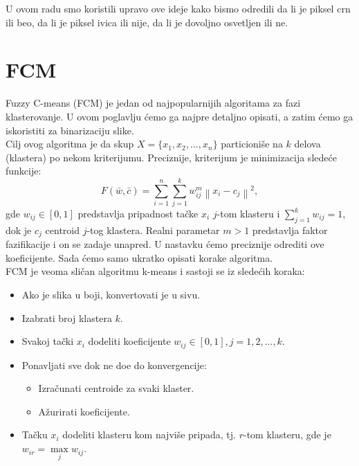 \documentclass[12pt,a4paper]{article}
\theoremstyle{definition}
\theoremstyle{remark}
\theoremstyle{plain}
\begin{document}
U ovom radu smo koristili upravo ove ideje kako bismo odredili da li je piksel crn ili beo, da li je piksel ivica ili nije, da li je dovoljno osvetljen ili ne.\\

\section{FCM}
\label{sec:FCM}
Fuzzy C-means (FCM) je jedan od najpopularnijih algoritama za fazi klasterovanje. U ovom poglavlju \' cemo ga najpre detaljno opisati, a zatim \' cemo ga iskoristiti za binarizaciju slike.\\

Cilj ovog algoritma je da skup $X=\{x_{1}, x_{2}, ..., x_{n}\}$ particioni\v se na $k$ delova (klastera) po 
nekom kriterijumu. Preciznije, kriterijum je minimizacija slede\' ce funkcije:
\begin{equation*}
 F(\bar{w}, \bar{c}) = \sum_{i=1}^{n}\sum_{j=1}^{k}w_{ij}^{m}\left\|x_{i}-c_{j}\right\|^{2},
\end{equation*}
gde $w_{ij}\in [0, 1]$ predstavlja pripadnost ta\v cke $x_{i}$ $j$-tom klasteru i $\sum_{j=1}^{k}w_{ij}=1$, dok je $c_{j}$ centroid $j$-tog klastera. Realni parametar $m>1$ predstavlja faktor fazifikacije i on se zadaje unapred.
U nastavku \' cemo preciznije odrediti ove koeficijente. Sada \' cemo samo ukratko opisati korake algoritma.\\

FCM je veoma sli\v can algoritmu k-means i sastoji se iz slede\' cih koraka:
\begin{itemize}
  \item Ako je slika u boji, konvertovati je u sivu. 
  \item Izabrati broj klastera $k$.
  \item Svakoj ta\v cki $x_{i}$ dodeliti koeficijente $w_{ij} \in [0, 1], j=1,2,..., k$.
  \item Ponavljati sve dok ne do\dj e do konvergencije:
    \begin{itemize}
      \item Izra\v cunati centroide za svaki klaster.
      \item A\v zurirati koeficijente.
    \end{itemize}
  \item Ta\v cku $x_{i}$ dodeliti klasteru kom najvi\v se pripada, tj. $r$-tom klasteru, gde je $w_{ir}=\max\limits_{j} w_{ij}$.
\end{itemize}
\end{document}
